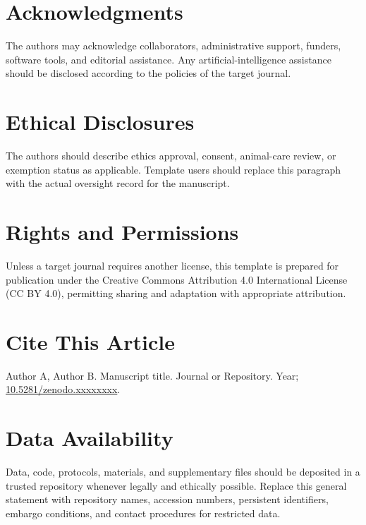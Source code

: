 {}
\section*{Acknowledgments}
The authors may acknowledge collaborators, administrative support, funders, software tools, and editorial assistance. Any artificial-intelligence assistance should be disclosed according to the policies of the target journal.

{}
\section*{Ethical Disclosures}
The authors should describe ethics approval, consent, animal-care review, or exemption status as applicable. Template users should replace this paragraph with the actual oversight record for the manuscript.

{}
\section*{Rights and Permissions}
Unless a target journal requires another license, this template is prepared for publication under the Creative Commons Attribution 4.0 International License (CC BY 4.0), permitting sharing and adaptation with appropriate attribution.

{}
\section*{Cite This Article}
Author A, Author B. Manuscript title. Journal or Repository. Year; \href{https://doi.org/10.5281/zenodo.xxxxxxxx}{10.5281/zenodo.xxxxxxxx}.

{}
\section*{Data Availability}
Data, code, protocols, materials, and supplementary files should be deposited in a trusted repository whenever legally and ethically possible. Replace this general statement with repository names, accession numbers, persistent identifiers, embargo conditions, and contact procedures for restricted data.

